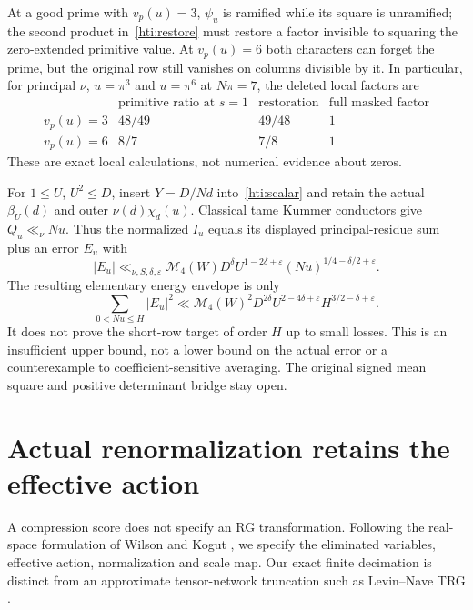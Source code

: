 \documentclass[11pt]{article}
\theoremstyle{definition}\newtheorem{definition}[theorem]{Definition}
\theoremstyle{remark}\newtheorem{remark}[theorem]{Remark}
\begin{document}
At a good prime with $v_p(u)=3$, $\psi_u$ is ramified while its square
is unramified; the second product in~\eqref{hti:restore} must restore a
factor invisible to squaring the zero-extended primitive value.
At $v_p(u)=6$ both characters can forget the prime, but the original row
still vanishes on columns divisible by it. In particular, for principal
$\nu$, $u=\pi^3$ and $u=\pi^6$ at $N\pi=7$, the deleted local factors are
\[
\begin{array}{c|ccc}
 &\text{primitive ratio at }s=1&\text{restoration}&\text{full masked factor}\\\hline
v_p(u)=3&48/49&49/48&1\\
v_p(u)=6&8/7&7/8&1
\end{array}
\]
These are exact local calculations, not numerical evidence about zeros.

For $1\le U$, $U^2\le D$, insert $Y=D/Nd$ into~\eqref{hti:scalar}
and retain the actual $\beta_U(d)$ and outer $\nu(d)\chi_d(u)$.
Classical tame Kummer conductors give $Q_u\ll_\nu Nu$. Thus the normalized
$I_u$ equals its displayed principal-residue sum plus an error $E_u$ with
\begin{equation}\label{hti:outer}
 |E_u|\ll_{\nu,S,\delta,\varepsilon}\mathcal M_4(W)
 D^\delta U^{1-2\delta+\varepsilon}
 (Nu)^{1/4-\delta/2+\varepsilon}.
\end{equation}
The resulting elementary energy envelope is only
\begin{equation}\label{hti:energy}
 \sum_{0<Nu\le H}|E_u|^2
 \ll\mathcal M_4(W)^2D^{2\delta}U^{2-4\delta+\varepsilon}
 H^{3/2-\delta+\varepsilon}.
\end{equation}
It does not prove the short-row target of order $H$ up to small losses.
This is an insufficient upper bound, not a lower bound on the actual
error or a counterexample to coefficient-sensitive averaging. The
original signed mean square and positive determinant bridge stay open.

\section{Actual renormalization retains the effective action}
\label{sec:actual-rg}
A compression score does not specify an RG transformation. Following the
real-space formulation of Wilson and Kogut \cite{WilsonKogutRG}, we specify
the eliminated variables, effective action, normalization and scale map.
Our exact finite decimation is distinct from an approximate tensor-network
truncation such as Levin--Nave TRG \cite{LevinNaveRG}.
\end{document}
